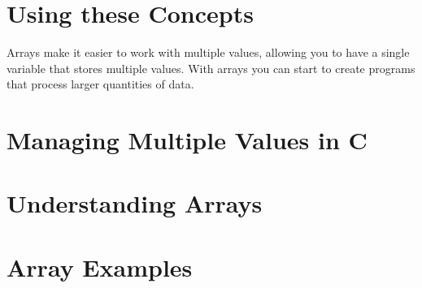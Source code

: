 







\clearpage
\section{Using these Concepts} %
\label{sec:arrays_using_these_concepts}

Arrays make it easier to work with multiple values, allowing you to have a single variable that stores multiple values. With arrays you can start to create programs that process larger quantities of data.





\clearpage
\def\pageLang{c}
\section{Managing Multiple Values in C} %
\label{sec:arrays_in_c}









\clearpage
\def\pageLang{none}
\section{Understanding Arrays} %
\label{sec:understanding_arrays}




\clearpage
\section{Array Examples} %
\label{sec:array_examples}

